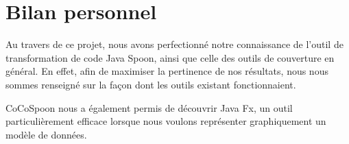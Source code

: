 \chapter*{Bilan personnel}
	\thispagestyle{personal_pov}
	
	\par Au travers de ce projet, nous avons perfectionné notre connaissance de l'outil de transformation de code Java Spoon, ainsi que celle des outils de couverture en général. En effet, afin de maximiser la pertinence de nos résultats, nous nous sommes renseigné sur la façon dont les outils existant fonctionnaient.
	
	\par CoCoSpoon nous a également permis de découvrir Java Fx, un outil particulièrement efficace lorsque nous voulons représenter graphiquement un modèle de données.